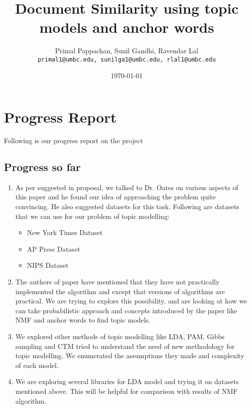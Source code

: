 \documentclass[a4paper,11pt]{article}
\begin{document}

\title{Document Similarity using topic models and anchor words}
\author{Primal Pappachan, Sunil Gandhi, Ravendar Lal \\ 
\texttt{primal1@umbc.edu, sunilga1@umbc.edu, rlal1@umbc.edu}}
\date{\today}
\maketitle



\section{Progress Report}
Following is our progress report on the project
\subsection{Progress so far}

\begin{enumerate}
\item As per suggested in proposal, we talked to Dr. Oates on various aspects of this paper and he found our idea of approaching the problem quite convincing. He also suggested datasets for this task. Following are datasets that we  can use for our problem of topic modelling:

\begin{itemize}
\item New York Times Dataset
\item AP Press Dataset
\item NIPS Dataset
\end{itemize}

\item The authors of paper have mentioned that they have not practically implemented the algorithm and except that versions of algorithms are practical. We are trying to explore this possibility, and are looking at how we can take probabilistic approach and concepts introduced by the paper like NMF and anchor words to find topic models.

\item We explored other methods of topic modelling like LDA, PAM, Gibbs sampling and CTM tried to understand the need of new methodology for topic modelling. We enumerated the assumptions they made and complexity of each model.
\item We are exploring several libraries for LDA model and trying it on datasets mentioned above. This will be helpful for comparison with results of NMF algorithm.

\end{enumerate}
\end{document}
